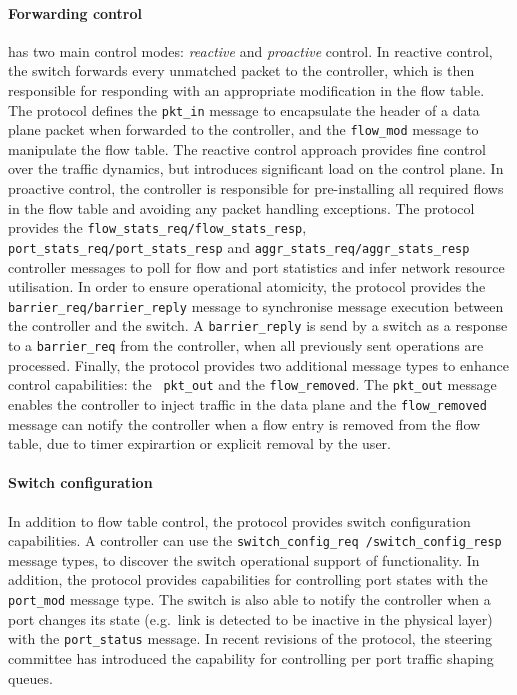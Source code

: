 \paragraph{Forwarding control}

\of has two main control modes: \emph{reactive} and \emph{proactive} control.
In reactive control, the switch forwards every unmatched packet to the
controller, which is then responsible for responding with an appropriate
modification in the flow table. The protocol defines the {\tt pkt\_in} message
to encapsulate the header of a data plane packet when forwarded to the
controller, and the {\tt flow\_mod} message to manipulate the flow table. The
reactive control approach provides fine control over the traffic dynamics, but
introduces significant load on the control plane. In proactive control, the
controller is responsible for pre-installing all required flows in the flow
table and avoiding any packet handling exceptions. The \of protocol provides
the \texttt{flow\_stats\_req/flow\_stats\_resp},
\texttt{port\_stats\_req/port\_stats\_resp} and
\texttt{aggr\_stats\_req/aggr\_stats\_resp} controller messages to poll for
flow and port statistics and infer network resource utilisation. In order to
ensure operational atomicity, the protocol provides the
\texttt{barrier\_req/barrier\_reply} message to synchronise message execution
between the controller and the switch. A {\tt barrier\_reply} is send by a
switch as a response to a {\tt barrier\_req} from the controller, when all
previously sent operations are processed.  Finally, the \of protocol provides
two additional message types to enhance control capabilities: the {\tt
pkt\_out} and the {\tt flow\_removed}. The {\tt pkt\_out} message enables the
controller to inject traffic in the data plane and the {\tt flow\_removed}
message can notify the controller when a flow entry is removed from the flow
table, due to timer expirartion or explicit removal by the user.

\paragraph{Switch configuration} 

In addition to flow table control, the protocol provides switch configuration
capabilities. A \of controller can use the \texttt{switch\_config\_req
/switch\_config\_resp} message types, to discover the switch operational
support of \of functionality.  In addition, the protocol provides capabilities
for controlling port states with the {\tt port\_mod} message type. The switch
is also able to notify the controller when a port changes its state (e.g.~link
is detected to be inactive in the physical layer) with the {\tt port\_status}
message. In recent revisions of the protocol, the steering committee has
introduced the capability for controlling per port traffic shaping queues. 

